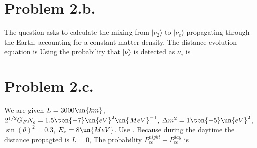 \documentclass{article}
\begin{document}
\section*{Problem 2.b.}
The question asks to calculate the mixing from $|\nu_2\rangle$ to $|\nu_e\rangle$ propagating through the Earth, accounting for a constant matter density. The distance evolution equation is
Using
the probability that $|\nu\rangle$ is detected as $\nu_e$ is
\section*{Problem 2.c.}
We are given $L=3000\un{km}$, $2^{1/2}G_F N_e = 1.5\ten{-7}\un{eV}^2\un{MeV}^{-1}$, $\Delta m^2=1\ten{-5}\un{eV}^2$, $\sin(\theta)^2=0.3$, $E_\nu=8\un{MeV}$. Use . Because during the daytime the distance propagted is $L=0$,
The probability $P^{night}_{ee}-P^{day}_{ee}$ is
\end{document}
